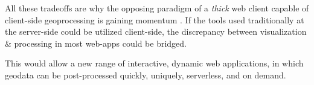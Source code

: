 




All these tradeoffs are why the opposing paradigm of a \textit{thick} web client capable of client-side geoprocessing is gaining momentum \cite{panidi_hybrid_2015, kulawiak_analysis_2019, hamilton_client-side_2014}. 
If the tools used traditionally at the server-side could be utilized client-side, the discrepancy between visualization \& processing in most web-apps could be bridged. 


This would allow a new range of interactive, dynamic web applications, in which geodata can be post-processed quickly, uniquely, serverless, and on demand. 


